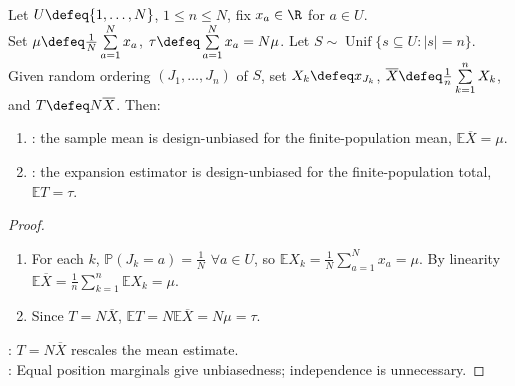 \begin{theorem} \label{thm:srs-unbiased-mean-and-total} \\
Let $U\defeq\{1,\ldots,N\}$, $1\leq n\leq N$, fix $x_a\in\R$ for $a\in U$.\\
Set $\mu\defeq \frac{1}{N}\sum\limits_{a=1}^{N}x_a$, $\tau\defeq\sum\limits_{a=1}^{N}x_a=N\mu$. Let $S\sim\operatorname{Unif}\{s\subseteq U:|s|=n\}$.\\
Given random ordering $(J_1,\ldots,J_n)$ of $S$, set $X_k\defeq x_{J_k}$, $\overline{X}\defeq \frac{1}{n}\sum\limits_{k=1}^{n}X_k$, and $T\defeq N\overline{X}$.  Then:
\begin{enumerate}[label=(\roman*)]
\setlength{\itemsep}{0pt}
\item {}: the sample mean is design-unbiased for the finite-population mean, $\mathbb{E}\overline{X}=\mu$.
\item {}: the expansion estimator is design-unbiased for the finite-population total, $\mathbb{E}T=\tau$.
\end{enumerate}
\begin{proof}
\begin{enumerate}[label=(\roman*)]
\setlength{\itemsep}{0pt}
\item For each $k$, $\mathbb{P}(J_k=a)=\frac{1}{N}$ $\forall a\in U$, so $\mathbb{E}X_k=\frac{1}{N}\sum\limits_{a=1}^{N}x_a=\mu$. By linearity $\mathbb{E}\overline{X}=\frac{1}{n}\sum\limits_{k=1}^{n}\mathbb{E}X_k=\mu$.
\item Since $T=N\overline{X}$, $\mathbb{E}T=N\mathbb{E}\overline{X}=N\mu=\tau$.
\end{enumerate}
: $T=N\overline{X}$ rescales the mean estimate.\\
: Equal position marginals give unbiasedness; independence is unnecessary.
\end{proof}
\end{theorem}

